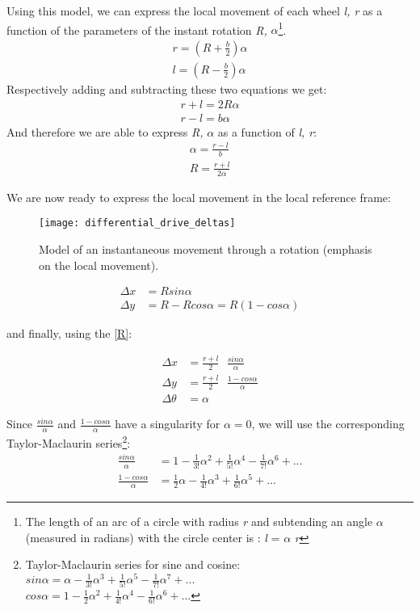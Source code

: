 Using this model, we can express the local movement of each wheel \textit{l, r} as a function of the parameters of the instant rotation \textit{R, }$\alpha$\footnote{The length of an arc of a circle with radius \textit{r} and subtending an angle $\alpha$ (measured in radians) with the circle center is : \textit{l} = $\alpha$ \textit{r}}.
\begin{gather*}
	r = ( R + \frac{b}{2} ) \alpha\\
	l = ( R - \frac{b}{2} ) \alpha
\end{gather*}
Respectively adding and subtracting these two equations we get:
\begin{gather*}
	r + l = 2 R \alpha\\
	r - l = b \alpha
\end{gather*}
And therefore we are able to express \textit{R, }$\alpha$ as a function of \textit{l, r}:
\begin{align}
	\alpha = \frac{r - l}{b}\\[3mm]
	R = \frac{r + l}{2 \alpha} \label{R}
\end{align}

We are now ready to express the local movement in the local reference frame:
\begin{figure}[!ht]
	\texttt{[image: differential\_drive\_deltas]}
	\captionsetup{justification=centering, margin=1.5cm}
	\centering
	\caption{Model of an instantaneous movement through a rotation (emphasis on the local movement).}
	\centering
\end{figure}
\begin{align}
	\Delta x &= R sin \alpha\\
	\Delta y &= R - R cos \alpha = R ( 1 - cos \alpha )
\end{align}

and finally, using the \eqref{R}:

\begin{align}
	\Delta x &= \frac{r + l}{2}\text{ } \frac{sin \alpha}{\alpha}\\[3mm]
	\Delta y &= \frac{r + l}{2}\text{ } \frac{1 - cos \alpha}{\alpha}\\[3mm]
	\Delta \theta &= \alpha
\end{align}

Since $\frac{sin \alpha}{\alpha}$ and $\frac{1 - cos \alpha}{\alpha}$ have a singularity for $\alpha = 0$, we will use the corresponding Taylor-Maclaurin series\footnote{Taylor-Maclaurin series for sine and cosine:\\[1mm] $sin \alpha = \alpha - \frac{1}{3!}\alpha^3 + \frac{1}{5!}\alpha^5 - \frac{1}{7!}\alpha^7 + ...$\\[2mm] $cos \alpha = 1 - \frac{1}{2}\alpha^2 + \frac{1}{4!}\alpha^4 - \frac{1}{6!}\alpha^6 + ...$}:
\begin{align}
	\frac{sin \alpha}{\alpha} &= 1 - \frac{1}{3!}\alpha^2 + \frac{1}{5!}\alpha^4 - \frac{1}{7!}\alpha^6 + ...\\[3mm]
	\frac{1 - cos \alpha}{\alpha} &= \frac{1}{2}\alpha - \frac{1}{4!}\alpha^3 + \frac{1}{6!}\alpha^5 + ...
\end{align}


